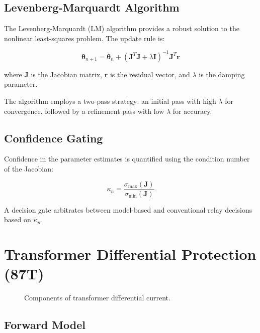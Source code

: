 \documentclass[12pt,a4paper]{article}
\begin{document}
\subsection{Levenberg-Marquardt Algorithm}
\label{subsec:lm}

The Levenberg-Marquardt (LM) algorithm provides a robust solution to the nonlinear least-squares problem. The update rule is:

\begin{equation}
\boldsymbol{\theta}_{n+1} = \boldsymbol{\theta}_n + (\mathbf{J}^T\mathbf{J} + \lambda \mathbf{I})^{-1} \mathbf{J}^T \mathbf{r}
\label{eq:lm}
\end{equation}

where $\mathbf{J}$ is the Jacobian matrix, $\mathbf{r}$ is the residual vector, and $\lambda$ is the damping parameter.

The algorithm employs a two-pass strategy: an initial pass with high $\lambda$ for convergence, followed by a refinement pass with low $\lambda$ for accuracy.

\subsection{Confidence Gating}
\label{subsec:confidence}

Confidence in the parameter estimates is quantified using the condition number of the Jacobian:

\begin{equation}
\kappa_n = \frac{\sigma_{\max}(\mathbf{J})}{\sigma_{\min}(\mathbf{J})}
\label{eq:condition}
\end{equation}

A decision gate arbitrates between model-based and conventional relay decisions based on $\kappa_n$.

\section{Transformer Differential Protection (87T)}
\label{sec:87t}

\begin{figure}[H]
\centering

\caption{Components of transformer differential current.}
\label{fig:87t_model}
\end{figure}

\subsection{Forward Model}
\label{subsec:87t_model}
\end{document}
